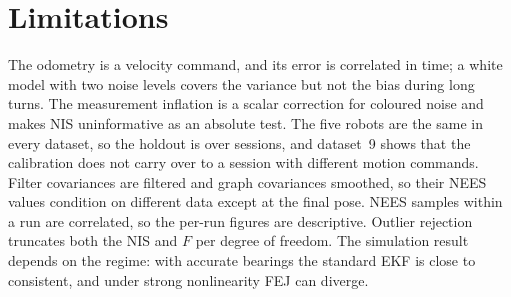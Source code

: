 \documentclass[conference]{IEEEtran}
\begin{document}
\section{Limitations}
The odometry is a velocity command, and its error is correlated in time; a white model with two noise levels covers the variance but not the bias during long turns. The measurement inflation is a scalar correction for coloured noise and makes NIS uninformative as an absolute test. The five robots are the same in every dataset, so the holdout is over sessions, and dataset~9 shows that the calibration does not carry over to a session with different motion commands. Filter covariances are filtered and graph covariances smoothed, so their NEES values condition on different data except at the final pose. NEES samples within a run are correlated, so the per-run figures are descriptive. Outlier rejection truncates both the NIS and $F$ per degree of freedom. The simulation result depends on the regime: with accurate bearings the standard EKF is close to consistent, and under strong nonlinearity FEJ can diverge.



\end{document}
